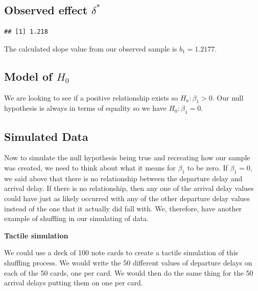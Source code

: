 \documentclass[]{tufte-book}
\newenvironment{Shaded}{\begin{snugshade}}{\end{snugshade}}
\newcommand{\KeywordTok}[1]{\textcolor[rgb]{0.13,0.29,0.53}{\textbf{{#1}}}}
\newcommand{\DecValTok}[1]{\textcolor[rgb]{0.00,0.00,0.81}{{#1}}}
\newcommand{\StringTok}[1]{\textcolor[rgb]{0.31,0.60,0.02}{{#1}}}
\newcommand{\NormalTok}[1]{{#1}}
\begin{document}
\subsection{\texorpdfstring{Observed effect
\(\delta^*\)}{Observed effect \textbackslash{}delta\^{}*}}\label{observed-effect-delta-2}

\begin{Shaded}
\end{Shaded}

\begin{verbatim}
## [1] 1.218
\end{verbatim}

The calculated slope value from our observed sample is \(b_1 = 1.2177\).

\subsection{\texorpdfstring{Model of
\(H_0\)}{Model of H\_0}}\label{model-of-h_0-2}

We are looking to see if a positive relationship exists so
\(H_a: \beta_1 > 0\). Our null hypothesis is always in terms of equality
so we have \(H_0: \beta_1 = 0\).

\subsection{Simulated Data}\label{simulated-data-2}

Now to simulate the null hypothesis being true and recreating how our
sample was created, we need to think about what it means for \(\beta_1\)
to be zero. If \(\beta_1 = 0\), we said above that there is no
relationship between the departure delay and arrival delay. If there is
no relationship, then any one of the arrival delay values could have
just as likely occurred with any of the other departure delay values
instead of the one that it actually did fall with. We, therefore, have
another example of shuffling in our simulating of data.

\textbf{Tactile simulation}

We could use a deck of 100 note cards to create a tactile simulation of
this shuffling process. We would write the 50 different values of
departure delays on each of the 50 cards, one per card. We would then do
the same thing for the 50 arrival delays putting them on one per card.
\end{document}
